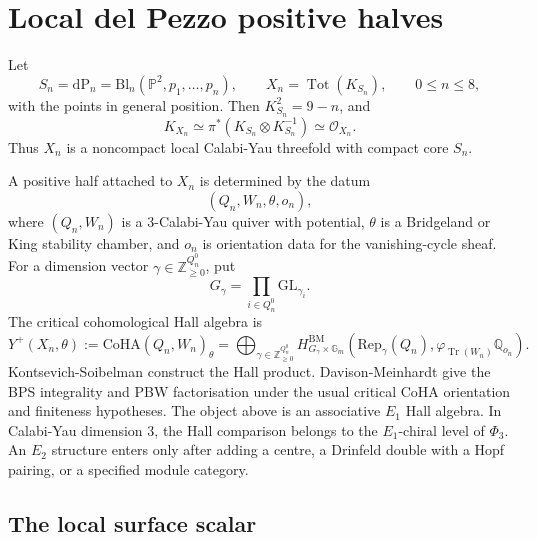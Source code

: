 \providecommand{\CoHA}{\mathrm{CoHA}}
\providecommand{\Yp}{Y^{+}}
\providecommand{\dP}{\mathrm{dP}}
\providecommand{\Pic}{\mathrm{Pic}}
\providecommand{\Rep}{\mathrm{Rep}}
\providecommand{\Jac}{\mathrm{Jac}}
\providecommand{\Tot}{\operatorname{Tot}}
\providecommand{\Spec}{\operatorname{Spec}}
\providecommand{\Tr}{\operatorname{Tr}}
\providecommand{\Ext}{\operatorname{Ext}}
\providecommand{\kch}{\kappa_{\mathrm{ch}}}
\providecommand{\kcat}{\kappa_{\mathrm{cat}}}
\providecommand{\kBKM}{\kappa_{\mathrm{BKM}}}
\providecommand{\TP}{\mathcal{T}}
\providecommand{\C}{\mathbb{C}}
\providecommand{\Z}{\mathbb{Z}}
\providecommand{\P}{\mathbb{P}}
\providecommand{\Gm}{\mathbb{G}_m}

\section*{Local del Pezzo positive halves}

Let
\[
  S_n=\dP_n=\mathrm{Bl}_n(\P^2,p_1,\ldots,p_n),
  \qquad
  X_n=\Tot(K_{S_n}),
  \qquad 0\leq n\leq 8,
\]
with the points in general position. Then \(K_{S_n}^2=9-n\), and
\[
  K_{X_n}\simeq
  \pi^*(K_{S_n}\otimes K_{S_n}^{-1})
  \simeq \mathcal O_{X_n}.
\]
Thus \(X_n\) is a noncompact local Calabi-Yau threefold with compact
core \(S_n\).

A positive half attached to \(X_n\) is determined by the datum
\[
  (Q_n,W_n,\theta,o_n),
\]
where \((Q_n,W_n)\) is a \(3\)-Calabi-Yau quiver with potential,
\(\theta\) is a Bridgeland or King stability chamber, and \(o_n\) is
orientation data for the vanishing-cycle sheaf. For a dimension vector
\(\gamma\in\Z_{\geq0}^{Q_n^0}\), put
\[
  G_\gamma=\prod_{i\in Q_n^0}\mathrm{GL}_{\gamma_i}.
\]
The critical cohomological Hall algebra is
\[
  \Yp(X_n,\theta)
  :=
  \CoHA(Q_n,W_n)_\theta
  =
  \bigoplus_{\gamma\in\Z_{\geq0}^{Q_n^0}}
  H^{\mathrm{BM}}_{G_\gamma\times \Gm}\!
  \left(
    \Rep_\gamma(Q_n),
    \varphi_{\Tr(W_n)}\mathbb Q_{o_n}
  \right).
\]
Kontsevich-Soibelman construct the Hall product. Davison-Meinhardt give
the BPS integrality and PBW factorisation under the usual critical CoHA
orientation and finiteness hypotheses. The object above is an
associative \(E_1\) Hall algebra. In Calabi-Yau dimension \(3\), the
Hall comparison belongs to the \(E_1\)-chiral level of \(\Phi_3\). An
\(E_2\) structure enters only after adding a centre, a Drinfeld double
with a Hopf pairing, or a specified module category.

\subsection*{The local surface scalar}

